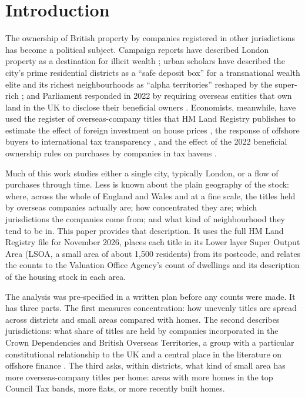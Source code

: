 \documentclass[11pt,a4paper]{article}
\begin{document}
\section{Introduction}\label{sec:intro}
The ownership of British property by companies registered in other jurisdictions has become a political subject. Campaign reports have described London property as a destination for illicit wealth \citep{tiuk2015,tiuk2017}; urban scholars have described the city's prime residential districts as a ``safe deposit box'' for a transnational wealth elite \citep{fernandez2016} and its richest neighbourhoods as ``alpha territories'' reshaped by the super-rich \citep{webber2016,burrows2017,atkinson2020}; and Parliament responded in 2022 by requiring overseas entities that own land in the UK to disclose their beneficial owners \citep{ecta2022}. Economists, meanwhile, have used the register of overseas-company titles that HM Land Registry publishes to estimate the effect of foreign investment on house prices \citep{sa2025}, the response of offshore buyers to international tax transparency \citep{bomare2022}, and the effect of the 2022 beneficial ownership rules on purchases by companies in tax havens \citep{collin2025}.

Much of this work studies either a single city, typically London, or a flow of purchases through time. Less is known about the plain geography of the stock: where, across the whole of England and Wales and at a fine scale, the titles held by overseas companies actually are; how concentrated they are; which jurisdictions the companies come from; and what kind of neighbourhood they tend to be in. This paper provides that description. It uses the full HM Land Registry file for November 2026, places each title in its Lower layer Super Output Area (LSOA, a small area of about 1,500 residents) from its postcode, and relates the counts to the Valuation Office Agency's count of dwellings and its description of the housing stock in each area.

The analysis was pre-specified in a written plan before any counts were made. It has three parts. The first measures concentration: how unevenly titles are spread across districts and small areas compared with homes. The second describes jurisdictions: what share of titles are held by companies incorporated in the Crown Dependencies and British Overseas Territories, a group with a particular constitutional relationship to the UK and a central place in the literature on offshore finance \citep{palan2010,shaxson2011,haberly2015a}. The third asks, within districts, what kind of small area has more overseas-company titles per home: areas with more homes in the top Council Tax bands, more flats, or more recently built homes.
\end{document}
